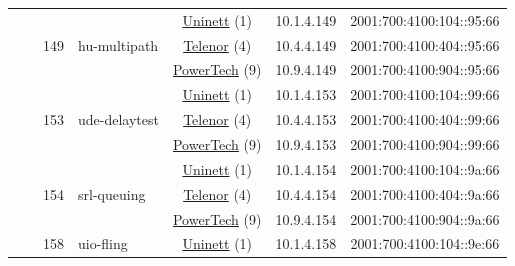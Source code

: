 \begin{small}
\begin{center}
\begin{longtable}{|c|c|c|c|c|c|c|c|}
  &  & \multirow{3}{*}{\tiny{149}} & \multicolumn{1}{|l|}{\multirow{3}{*}{\tiny{hu-multipath}}} & \multicolumn{2}{|c|}{\tiny{\href{https://www.uninett.no}{Uninett} (1)}} & \tiny{10.1.4.149} & \tiny{2001:700:4100:104::95:66} \\* \cline{5-5}\cline{6-6}\cline{7-7}\cline{8-8}
  &  &  &  & \multicolumn{2}{|c|}{\tiny{\href{https://www.telenor.no}{Telenor} (4)}} & \tiny{10.4.4.149} & \tiny{2001:700:4100:404::95:66} \\* \cline{5-5}\cline{6-6}\cline{7-7}\cline{8-8}
  &  &  &  & \multicolumn{2}{|c|}{\tiny{\href{http://www.powertech.no}{PowerTech} (9)}} & \tiny{10.9.4.149} & \tiny{2001:700:4100:904::95:66} \\* \cline{3-3}\cline{4-4}\cline{5-5}\cline{6-6}\cline{7-7}\cline{8-8}
  &  & \multirow{3}{*}{\tiny{153}} & \multicolumn{1}{|l|}{\multirow{3}{*}{\tiny{ude-delaytest}}} & \multicolumn{2}{|c|}{\tiny{\href{https://www.uninett.no}{Uninett} (1)}} & \tiny{10.1.4.153} & \tiny{2001:700:4100:104::99:66} \\* \cline{5-5}\cline{6-6}\cline{7-7}\cline{8-8}
  &  &  &  & \multicolumn{2}{|c|}{\tiny{\href{https://www.telenor.no}{Telenor} (4)}} & \tiny{10.4.4.153} & \tiny{2001:700:4100:404::99:66} \\* \cline{5-5}\cline{6-6}\cline{7-7}\cline{8-8}
  &  &  &  & \multicolumn{2}{|c|}{\tiny{\href{http://www.powertech.no}{PowerTech} (9)}} & \tiny{10.9.4.153} & \tiny{2001:700:4100:904::99:66} \\* \cline{3-3}\cline{4-4}\cline{5-5}\cline{6-6}\cline{7-7}\cline{8-8}
  &  & \multirow{3}{*}{\tiny{154}} & \multicolumn{1}{|l|}{\multirow{3}{*}{\tiny{srl-queuing}}} & \multicolumn{2}{|c|}{\tiny{\href{https://www.uninett.no}{Uninett} (1)}} & \tiny{10.1.4.154} & \tiny{2001:700:4100:104::9a:66} \\* \cline{5-5}\cline{6-6}\cline{7-7}\cline{8-8}
  &  &  &  & \multicolumn{2}{|c|}{\tiny{\href{https://www.telenor.no}{Telenor} (4)}} & \tiny{10.4.4.154} & \tiny{2001:700:4100:404::9a:66} \\* \cline{5-5}\cline{6-6}\cline{7-7}\cline{8-8}
  &  &  &  & \multicolumn{2}{|c|}{\tiny{\href{http://www.powertech.no}{PowerTech} (9)}} & \tiny{10.9.4.154} & \tiny{2001:700:4100:904::9a:66} \\* \cline{3-3}\cline{4-4}\cline{5-5}\cline{6-6}\cline{7-7}\cline{8-8}
  &  & \multirow{3}{*}{\tiny{158}} & \multicolumn{1}{|l|}{\multirow{3}{*}{\tiny{uio-fling}}} & \multicolumn{2}{|c|}{\tiny{\href{https://www.uninett.no}{Uninett} (1)}} & \tiny{10.1.4.158} & \tiny{2001:700:4100:104::9e:66} \\* \cline{5-5}\cline{6-6}\cline{7-7}\cline{8-8}

\end{longtable}
\end{center}
\end{small}

